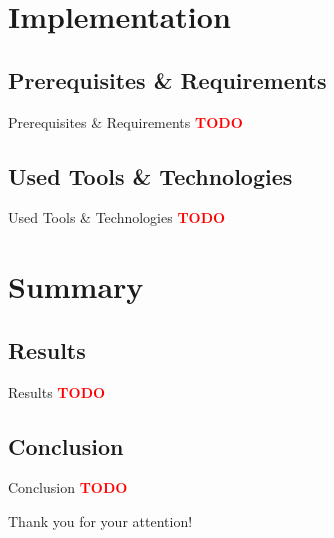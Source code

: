 \documentclass[]{beamer}
\newcommand{\TODO}{\textbf{\textcolor{red}{TODO}}} %
\begin{document}
\section[Implementation]{Implementation}

  \subsection{Prerequisites \& Requirements}

    \begin{frame}{Prerequisites \& Requirements}
      \TODO
    \end{frame}

  \subsection{Used Tools \& Technologies}

    \begin{frame}{Used Tools \& Technologies}
      \TODO
    \end{frame}

\section[Summary]{Summary}

  \subsection{Results}

    \begin{frame}{Results}
      \TODO
    \end{frame}

  \subsection{Conclusion}

    \begin{frame}{Conclusion}
      \TODO
    \end{frame}




\begin{frame}[plain]
  \vspace{20mm}
  \centerline{Thank you for your attention!}
\end{frame}
\end{document}
